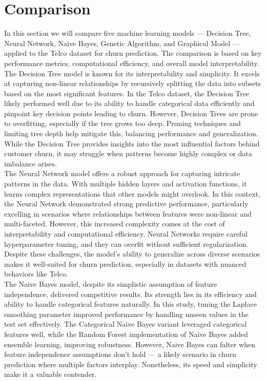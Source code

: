 \section{Comparison}
In this section we will compare five machine learning models — Decision Tree, Neural Network, Naive Bayes, Genetic Algorithm, and Graphical Model — applied to the Telco dataset for churn prediction. The comparison is based on key performance metrics, computational efficiency, and overall model interpretability.\\

The Decision Tree model is known for its interpretability and simplicity. It excels at capturing non-linear relationships by recursively splitting the data into subsets based on the most significant features. In the Telco dataset, the Decision Tree likely performed well due to its ability to handle categorical data efficiently and pinpoint key decision points leading to churn. However, Decision Trees are prone to overfitting, especially if the tree grows too deep. Pruning techniques and limiting tree depth help mitigate this, balancing performance and generalization. While the Decision Tree provides insights into the most influential factors behind customer churn, it may struggle when patterns become highly complex or data imbalance arises.\\

The Neural Network model offers a robust approach for capturing intricate patterns in the data. With multiple hidden layers and activation functions, it learns complex representations that other models might overlook. In this context, the Neural Network demonstrated strong predictive performance, particularly excelling in scenarios where relationships between features were non-linear and multi-faceted. However, this increased complexity comes at the cost of interpretability and computational efficiency. Neural Networks require careful hyperparameter tuning, and they can overfit without sufficient regularization. Despite these challenges, the model’s ability to generalize across diverse scenarios makes it well-suited for churn prediction, especially in datasets with nuanced behaviors like Telco.\\

The Naive Bayes model, despite its simplistic assumption of feature independence, delivered competitive results. Its strength lies in its efficiency and ability to handle categorical features naturally. In this study, tuning the Laplace smoothing parameter improved performance by handling unseen values in the test set effectively. The Categorical Naive Bayes variant leveraged categorical features well, while the Random Forest implementation of Naive Bayes added ensemble learning, improving robustness. However, Naive Bayes can falter when feature independence assumptions don’t hold — a likely scenario in churn prediction where multiple factors interplay. Nonetheless, its speed and simplicity make it a valuable contender.\\

